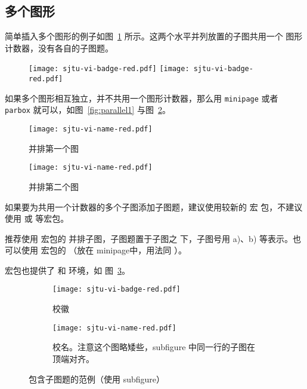 \documentclass{sjtureport}
\begin{document}
\subsection{多个图形}

简单插入多个图形的例子如图~\ref{fig:SRR} 所示。这两个水平并列放置的子图共用一个
图形计数器，没有各自的子图题。

\begin{figure}[!htp]
	\centering
	\texttt{[image: sjtu-vi-badge-red.pdf]}
	\hspace{1cm}
	\texttt{[image: sjtu-vi-badge-red.pdf]}
	\label{fig:SRR}
\end{figure}

如果多个图形相互独立，并不共用一个图形计数器，那么用 \texttt{minipage} 或者
\texttt{parbox} 就可以，如图~\ref{fig:parallel1} 与图~\ref{fig:parallel2}。

\begin{figure}[!htp]
	\centering
	\begin{minipage}{0.48\textwidth}
		\centering
		\texttt{[image: sjtu-vi-name-red.pdf]}
		\caption{并排第一个图}
		\label{fig:parallel1}
	\end{minipage}\hfill
	\begin{minipage}{0.48\textwidth}
		\centering
		\texttt{[image: sjtu-vi-name-red.pdf]}
		\caption{并排第二个图}
		\label{fig:parallel2}
	\end{minipage}
\end{figure}

如果要为共用一个计数器的多个子图添加子图题，建议使用较新的  宏
包，不建议使用  或  等宏包。

推荐使用  宏包的  并排子图，子图题置于子图之
下，子图号用 a)、b) 等表示。也可以使用  宏包的 
（放在 minipage中，用法同 ）。

 宏包也提供了  和  环境，如
图~\ref{fig:subfigure}。

\begin{figure}[!htp]
	\centering
	\begin{subfigure}{0.3\textwidth}
		\centering
		\texttt{[image: sjtu-vi-badge-red.pdf]}
		\caption{校徽}
	\end{subfigure}
	\hspace{1cm}
	\begin{subfigure}{0.4\textwidth}
		\centering
		\texttt{[image: sjtu-vi-name-red.pdf]}
		\caption{校名。注意这个图略矮些，subfigure 中同一行的子图在顶端对齐。}
	\end{subfigure}
	\caption{包含子图题的范例（使用 subfigure）}
	\label{fig:subfigure}
\end{figure}
\end{document}
